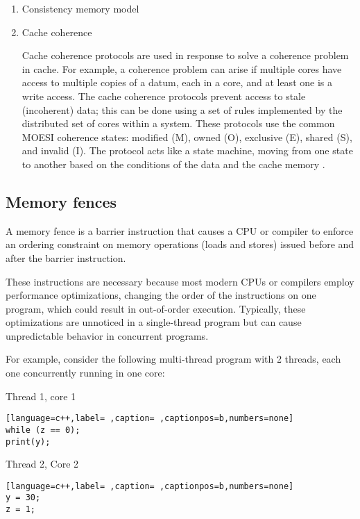 \begin{enumerate}
\item Consistency memory model
\label{sec:org5f315b5}



\item Cache coherence
\label{sec:org01ed92c}

Cache coherence protocols are used in response to solve a coherence problem
in cache. For example, a coherence problem can arise if multiple cores have
access to multiple copies of a datum, each in a core, and at least one
is a write access. The cache coherence protocols prevent access to
stale (incoherent) data; this can be done using a set of rules
implemented by the distributed set of cores within a system. These
protocols use the common MOESI coherence states: modified (M), owned (O),
exclusive (E), shared (S), and invalid (I). The protocol acts like a state
machine, moving from one state to another based on the conditions of the
data and the cache memory \cite{DBLP_series_synthesis_2020Nagarajan}.
\end{enumerate}



\subsection{Memory fences}
\label{sec:org8a96e19}

A memory fence is a barrier instruction that causes a CPU or compiler to
enforce an ordering constraint on memory operations (loads and stores)
issued before and after the barrier instruction.

These instructions are necessary because most modern CPUs or compilers
employ performance optimizations, changing the order of the instructions on
one program, which could result in out-of-order execution. Typically, these optimizations are unnoticed in a single-thread program but can cause unpredictable behavior in concurrent programs.

For example, consider the following multi-thread program with 2
threads, each one concurrently running in one core:

Thread 1, core 1
\begin{lstlisting}[language=c++,label= ,caption= ,captionpos=b,numbers=none]
while (z == 0);
print(y);
\end{lstlisting}

Thread 2, Core 2
\begin{lstlisting}[language=c++,label= ,caption= ,captionpos=b,numbers=none]
y = 30;
z = 1;
\end{lstlisting}

